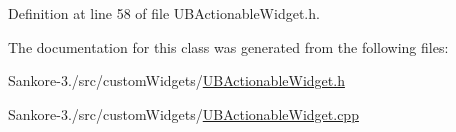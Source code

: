 Definition at line 58 of file U\-B\-Actionable\-Widget.\-h.



The documentation for this class was generated from the following files\-:\begin{DoxyCompactItemize}
\item 
Sankore-\/3./src/custom\-Widgets/\hyperlink{_u_b_actionable_widget_8h}{U\-B\-Actionable\-Widget.\-h}\item 
Sankore-\/3./src/custom\-Widgets/\hyperlink{_u_b_actionable_widget_8cpp}{U\-B\-Actionable\-Widget.\-cpp}\end{DoxyCompactItemize}
